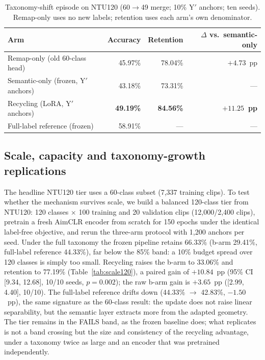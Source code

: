\documentclass[preprint,12pt,number]{elsarticle}
\begin{document}
\begin{table}[H]
\centering
\caption{Taxonomy-shift episode on NTU120 (60$\rightarrow$49 merge; 10\% Y$'$
anchors; ten seeds). Remap-only uses no new labels; retention uses each arm's
own denominator.}
\label{tab:taxshift}
\small
\begin{tabular}{@{}lrrr@{}}
\toprule
Arm & Accuracy & Retention & $\Delta$ vs.\ semantic-only \\
\midrule
Remap-only (old 60-class head) & 45.97\% & 78.04\% & $+4.73$~pp \\
Semantic-only (frozen, Y$'$ anchors) & 43.18\% & 73.31\% & --- \\
Recycling (LoRA, Y$'$ anchors) & \textbf{49.19\%} & \textbf{84.56\%} & \textbf{$+11.25$~pp} \\
Full-label reference (frozen) & 58.91\% & --- & --- \\
\bottomrule
\end{tabular}
\end{table}

\subsection{Scale, capacity and taxonomy-growth replications}

The headline NTU120 tier uses a 60-class subset (7,337 training clips). To
test whether the mechanism survives scale, we build a balanced 120-class tier
from NTU120: 120 classes $\times$ 100 training and 20 validation clips
(12,000/2,400 clips), pretrain a fresh AimCLR encoder from scratch for 150
epochs under the identical label-free objective, and rerun the three-arm
protocol with 1,200 anchors per seed. Under the full taxonomy the frozen
pipeline retains 66.33\% (b-arm 29.41\%, full-label reference 44.33\%), far
below the 85\% band: a 10\% budget spread over 120 classes is simply too
small. Recycling raises the b-arm to 33.06\% and retention to 77.19\%
(Table~\ref{tab:scale120}), a paired gain of $+10.84$~pp (95\% CI
[9.34, 12.68], 10/10 seeds, $p=0.002$); the raw b-arm gain is $+3.65$~pp
([2.99, 4.40], 10/10). The full-label reference drifts down (44.33\% $\rightarrow$
42.83\%, $-1.50$~pp), the same signature as the 60-class result: the update
does not raise linear separability, but the semantic layer extracts more from
the adapted geometry. The tier remains in the FAILS band, as the frozen
baseline does; what replicates is not a band crossing but the size and
consistency of the recycling advantage, under a taxonomy twice as large and
an encoder that was pretrained independently.
\end{document}
